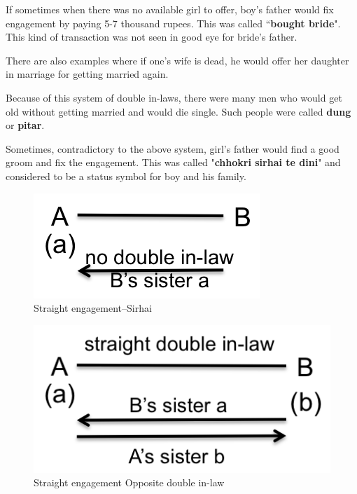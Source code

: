 If sometimes when there was no available girl to offer, boy's father would fix
engagement by paying 5-7 thousand rupees. This was called ``\textbf{bought
bride}". This kind of transaction was not seen in good eye for bride's father.

There are also examples where if one's wife is dead, he would offer her
daughter in marriage for getting married again. 

Because of this system of double in-laws, there were many men who would get old
without getting married and would die single. Such people were called
\textbf{dung} or \textbf{pitar}.

Sometimes, contradictory to the above system, girl's father would find a good
groom and fix the engagement. This was called "\textbf{chhokri sirhai te dini}"
and considered to be a status symbol for boy and his family.

\begin{figure}
\center
\includegraphics{figures/engagement/straight-sirhai}
\caption{Straight engagement--Sirhai
\label{figure:engage_1}}
\end{figure}

\begin{figure}
\center
\includegraphics{figures/engagement/straight_opposite_2}
\caption{ Straight engagement Opposite double in-law
\label{figure:engage_2}}
\end{figure}

